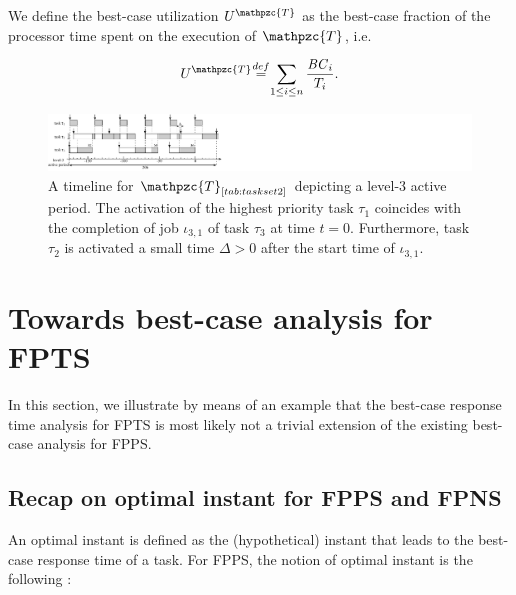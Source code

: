 \documentclass[conference,compsoc]{IEEEtran}
\newcommand\defeq{\stackrel{\mathclap{\tiny\mbox{def}}}{=}}
\newcommand{\bc}    {\mbox{\it BC}}
\begin{document}
We define the best-case utilization $U^{\mathpzc{T}}$ as the best-case fraction of the  processor time spent on the execution of $\mathpzc{T}$, i.e.

%
\begin{align}
U^{\mathpzc{T}} \defeq \sum_{1\leq i \leq n} \frac{\bc_i}{T_i}.
\end{align} 

\begin{figure}
	\centering
	\includegraphics[width=0.66\linewidth]{fig/fpps_fact1_2}
	\caption{A timeline for $\mathpzc{T}_{\ref{tab:taskset2}}$ depicting a level-3 active period. The activation of the highest priority task $\tau_1$ coincides with the completion of job $\iota_{3,1}$ of task $\tau_3$ at time $t=0$. Furthermore, task $\tau_2$ is activated a small time $\Delta > 0$ after the start time of $\iota_{3,1}$.}
	\label{fig:fpps_fact1}
\end{figure}


\section{Towards best-case analysis for FPTS}

In this section, we illustrate by means of an example that the best-case response time analysis for FPTS is most likely not a trivial extension of the existing best-case analysis for FPPS.

\subsection{Recap on optimal instant for FPPS and FPNS}
An optimal instant is defined as the (hypothetical) instant that leads to the best-case response time of a task. For FPPS, the notion of optimal instant is the following \cite{BLM13}:
\end{document}
